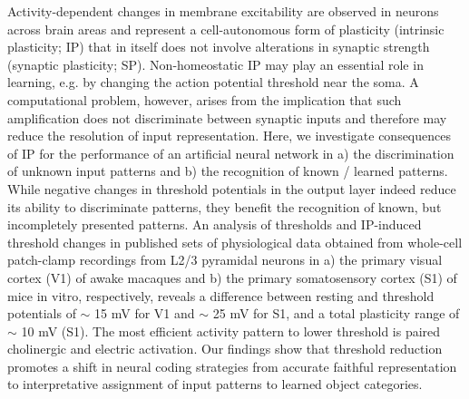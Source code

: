 Activity-dependent changes in membrane excitability
    are observed in neurons across brain areas
    and represent a cell-autonomous form of plasticity (intrinsic plasticity; IP)
    that in itself does not involve alterations in synaptic strength (synaptic plasticity; SP).
Non-homeostatic IP may play an essential role in learning,
    e.g. by changing the action potential threshold near the soma.
A computational problem, however, arises from the implication that
    such amplification does not discriminate between synaptic inputs
    and therefore may reduce the resolution of input representation.
Here, we investigate consequences of IP for the performance of an artificial neural network in
    a) the discrimination of unknown input patterns
    and b) the recognition of known / learned patterns.
While negative changes in threshold potentials in the output layer
    indeed reduce its ability to discriminate patterns,
    they benefit the recognition of known, but incompletely presented patterns.
An analysis of thresholds and IP-induced threshold changes
    in published sets of physiological data obtained
    from whole-cell patch-clamp recordings
    from L2/3 pyramidal neurons in
    a) the primary visual cortex (V1) of awake macaques
    and b) the primary somatosensory cortex (S1) of mice in vitro, respectively,
    reveals a difference between resting and threshold potentials
    of $\sim$ 15 mV for V1
    and $\sim$ 25 mV for S1,
    and a total plasticity range of $\sim$ 10 mV (S1).
The most efficient activity pattern to lower threshold
    is paired cholinergic and electric activation.
Our findings show that threshold reduction
    promotes a shift in neural coding strategies
    from accurate faithful representation to interpretative assignment of input patterns to learned object categories.


